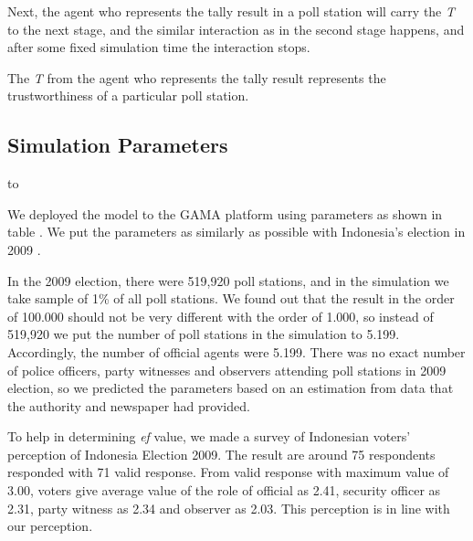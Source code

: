 \documentclass[JIP]{ipsj}
\begin{document}
Next, the agent who represents the tally result in a poll station will carry the \textit{T} to the next stage, and the similar interaction as in the second stage happens, and after some fixed simulation time the interaction stops.

The \textit{T} from the agent who represents the tally result represents the trustworthiness of a particular poll station.


\subsection{Simulation Parameters}%

\begin{table}[tb]
\caption{Simulation Parameters}
\label{tab:simpar}
\hbox to
\end{table}

We deployed the model to the GAMA platform using parameters as shown in table . We put the parameters as similarly as possible with Indonesia's election in 2009 \cite{KPU200903}\cite{PemiluIndonesia20090313}.

In the 2009 election, there were 519,920 poll stations, and in the simulation we take sample of 1\% of all poll stations. We found out that the result in the order of 100.000 should not be very different with the order of 1.000, so instead of 519,920 we put the number of poll stations in the simulation to 5.199. Accordingly, the number of official agents were 5.199. There was no exact number of police officers, party witnesses and observers attending poll stations in 2009 election, so we predicted the parameters based on an estimation from data that the authority and newspaper had provided.

To help in determining \textit{ef} value, we made a survey of Indonesian voters' perception of Indonesia Election 2009\cite{SurveiPersepsiPemilu2009}. The result are around 75 respondents responded with 71 valid response. From valid response with maximum value of 3.00, voters give average value of the role of official as 2.41, security officer as 2.31, party witness as 2.34 and observer as 2.03. This perception is in line with our perception.
\end{document}
